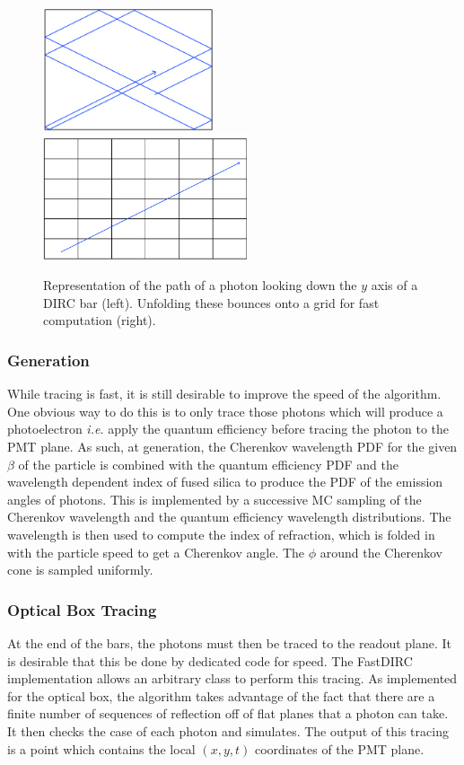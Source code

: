 \begin{figure}[!h]
\centering
\includegraphics[width=0.45\textwidth]{pics/bouncesLarge.png}
\includegraphics[width=0.54\textwidth]{pics/bouncesUnfolding.png}
\caption{Representation of the path of a photon looking down the $y$ axis of a DIRC bar (left).  Unfolding these bounces onto a grid for fast computation (right).}
\label{fig:bounces_unfolding}
\end{figure}


\subsubsection*{Generation}
While tracing is fast, it is still desirable to improve the speed of the algorithm.  One obvious way to do this is to only trace those photons which will produce a photoelectron {\em i.e.} apply the quantum efficiency before tracing the photon to the PMT plane.  As such, at generation, the Cherenkov wavelength PDF for the given $\beta$ of the particle is combined with the quantum efficiency PDF and the wavelength dependent index of fused silica to produce the PDF of the emission angles of photons.  
This is implemented by a successive MC sampling of the Cherenkov wavelength and the quantum efficiency wavelength distributions.  
The wavelength is then used to compute the index of refraction, which is folded in with the particle speed to get a Cherenkov angle.  
The $\phi$ around the Cherenkov cone is sampled uniformly.

\subsubsection*{Optical Box Tracing}
At the end of the bars, the photons must then be traced to the readout plane.  It is desirable that this be done by dedicated code for speed.  The FastDIRC implementation allows an arbitrary class to perform this tracing.  As implemented for the \gluex optical box, the algorithm takes advantage of the fact that there are a finite number of sequences of reflection off of flat planes that a photon can take.  It then checks the case of each photon and simulates.  The output of this tracing is a point which contains the local $(x,y,t)$ coordinates of the PMT plane.

